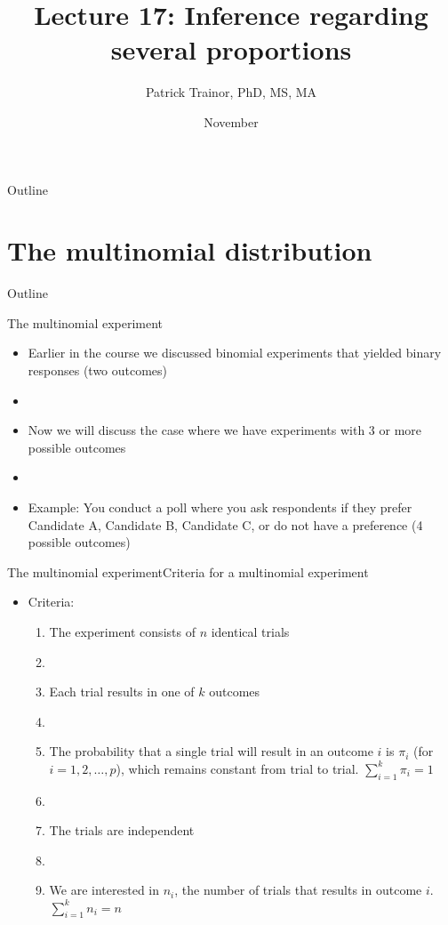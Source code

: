 \documentclass[xcolor=dvipsnames]{beamer}
\title[Lecture 17]{Lecture 17: Inference regarding several proportions}
\author[Patrick Trainor]{Patrick Trainor, PhD, MS, MA}
\institute[NMSU]{New Mexico State University}
\date{November}
\begin{document}
\begin{frame}
\maketitle
\end{frame}

\begin{frame}{Outline}
\tableofcontents[hideallsubsections]
\end{frame}

\section{The multinomial distribution}
\begin{frame}{Outline}
\tableofcontents[currentsection,subsectionstyle=show/shaded/hide]
\end{frame}

\begin{frame}{The multinomial experiment}
	\begin{itemize}
		\item Earlier in the course we discussed binomial experiments that yielded binary responses (two outcomes)
		\item[]
		\item Now we will discuss the case where we have experiments with 3 or more possible outcomes
		\item[]
		\item Example: You conduct a poll where you ask respondents if they prefer Candidate A, Candidate B, Candidate C, or do not have a preference (4 possible outcomes)
	\end{itemize}
\end{frame}

\begin{frame}{The multinomial experiment}{Criteria for a multinomial experiment}
	\begin{itemize}
		\item Criteria:
		\begin{enumerate}
			\item The experiment consists of $n$ identical trials
			\item[]
			\item Each trial results in one of $k$ outcomes
			\item[]
			\item The probability that a single trial will result in an outcome $i$ is $\pi_i$ (for $i=1, 2, \hdots, p$), which remains constant from trial to trial. $\sum_{i=1}^k \pi_i = 1$
			\item[]
			\item The trials are independent
			\item[]
			\item We are interested in $n_i$, the number of trials that results in outcome $i$. $\sum_{i=1}^k n_i = n$
		\end{enumerate}
	\end{itemize}
\end{frame}
\end{document}
